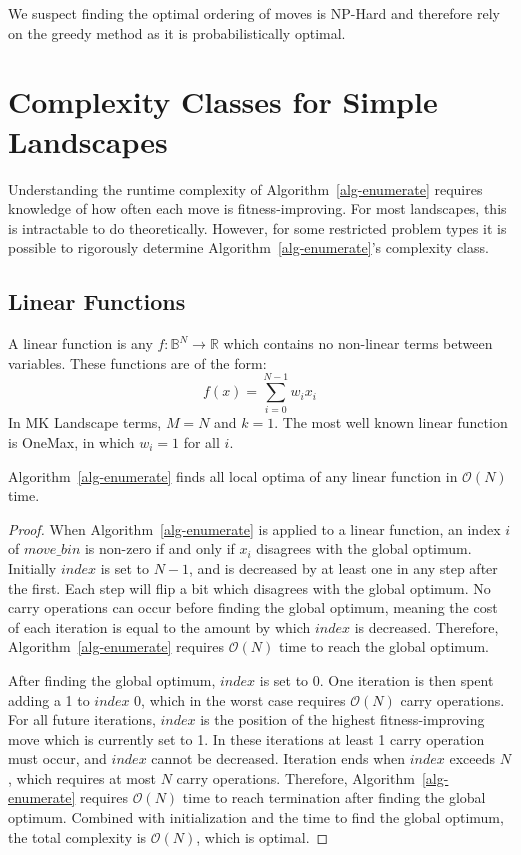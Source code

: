 \documentclass[runningheads,a4paper]{llncs}
\newcommand{\BigO}[1]{$\mathcal{O}{(#1)}$}
\begin{document}
We suspect finding the optimal ordering of moves is NP-Hard and therefore rely on
the greedy method as it is probabilistically optimal.

\section{Complexity Classes for Simple Landscapes}
Understanding the runtime complexity of Algorithm~\ref{alg-enumerate} requires
knowledge of how often each move is fitness-improving. For most landscapes,
this is intractable to do theoretically. However, for some restricted problem
types it is possible to rigorously determine Algorithm~\ref{alg-enumerate}'s complexity class.

\subsection{Linear Functions}
A linear function is any $f : \mathbb{B}^{N}\rightarrow \mathbb{R}$ which contains
no non-linear terms between variables. These functions are of the form:
\begin{equation}
  f(x) = \sum_{i=0}^{N-1} w_ix_i
  \label{eq-linear}
\end{equation}
In MK Landscape terms, $M=N$ and $k=1$. The most well known linear function is OneMax,
in which $w_i=1$ for all $i$.

\begin{theorem}
Algorithm~\ref{alg-enumerate} finds all local optima of any linear function
in \BigO{N} time.
\end{theorem}

\begin{proof}
When Algorithm~\ref{alg-enumerate} is applied to a linear
function, an index $i$ of $move\_bin$ is non-zero if and only if
$x_i$ disagrees with the global optimum.
Initially $index$ is set to $N-1$, and is decreased by at least one in any step after the first.
Each step will flip a bit which disagrees with the global optimum.
No carry operations can occur before finding the global optimum, meaning the
cost of each iteration is equal to the amount by which $index$ is decreased.
Therefore, Algorithm~\ref{alg-enumerate} requires \BigO{N} time to reach
the global optimum.

After finding the global optimum, $index$ is set to 0. One iteration
is then spent adding a 1 to $index$ 0, which in the worst case requires \BigO{N}
carry operations. For all future iterations, $index$ is the position of the highest fitness-improving move
which is currently set to 1. In these iterations at least 1 carry operation must
occur, and $index$ cannot be decreased. Iteration ends when $index$ exceeds $N$,
which requires at most $N$ carry operations. Therefore, Algorithm~\ref{alg-enumerate}
requires \BigO{N} time to reach termination after finding the global optimum. Combined
with initialization and the time to find the global optimum, the total complexity is \BigO{N},
which is optimal.
\end{proof}
\end{document}
